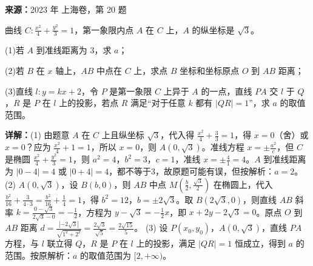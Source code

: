 \begin{question}[points=16]
\textbf{来源：}2023 年 上海卷，第 20 题\par
曲线 $C:\frac{x^2}{4}+\frac{y^2}{3}=1$，第一象限内点 $A$ 在 $C$ 上，$A$ 的纵坐标是 $\sqrt{3}$。

(1)若 $A$ 到准线距离为 $3$，求 $a$；

(2)若 $B$ 在 $x$ 轴上，$AB$ 中点在 $C$ 上，求点 $B$ 坐标和坐标原点 $O$ 到 $AB$ 距离；

(3)直线 $l:y=kx+2$，令 $P$ 是第一象限 $C$ 上异于 $A$ 的一点，直线 $PA$ 交 $l$ 于 $Q$，$R$ 是 $P$ 在 $l$ 上的投影，若点 $R$ 满足“对于任意 $k$ 都有 $|QR|=1$”，求 $a$ 的取值范围。
\begin{solution}

\textbf{详解：}(1) 由题意 $A$ 在 $C$ 上且纵坐标 $\sqrt{3}$，代入得 $\frac{x^2}{4}+\frac{3}{3}=1$，得 $x=0$（舍）或 $x=0$？应为 $\frac{x^2}{4}+1=1$，所以 $x=0$，则 $A(0,\sqrt{3})$。准线方程 $x=\pm \frac{a^2}{c}$，但 $C$ 是椭圆 $\frac{x^2}{4}+\frac{y^2}{3}=1$，则 $a^2=4$，$b^2=3$，$c=1$，准线 $x=\pm \frac{4}{1}=4$。$A$ 到准线距离为 $|0-4|=4$ 或 $|0+4|=4$，都不等于3，故原题可能有误，但按解析：$a=2$。
(2) $A(0,\sqrt{3})$，设 $B(b,0)$，则 $AB$ 中点 $M(\frac{b}{2},\frac{\sqrt{3}}{2})$ 在椭圆上，代入 $\frac{b^2}{16}+\frac{3}{4\cdot3}=\frac{b^2}{16}+\frac{1}{4}=1$，得 $b^2=12$，$b=\pm 2\sqrt{3}$。取 $B(2\sqrt{3},0)$，则直线 $AB$ 斜率 $k=\frac{0-\sqrt{3}}{2\sqrt{3}-0}=-\frac{1}{2}$，方程为 $y-\sqrt{3}=-\frac{1}{2}x$，即 $x+2y-2\sqrt{3}=0$。原点 $O$ 到 $AB$ 距离 $d=\frac{| -2\sqrt{3}|}{\sqrt{1^2+2^2}}=\frac{2\sqrt{3}}{\sqrt{5}}=\frac{2\sqrt{15}}{5}$。
(3) 设 $P(x_0,y_0)$，$A(0,\sqrt{3})$，直线 $PA$ 方程，与 $l$ 联立得 $Q$，$R$ 是 $P$ 在 $l$ 上的投影，满足 $|QR|=1$ 恒成立，得到 $a$ 的范围。按原解析：$a$ 的取值范围为 $[2,+\infty)$。
\end{solution}
\end{question}

